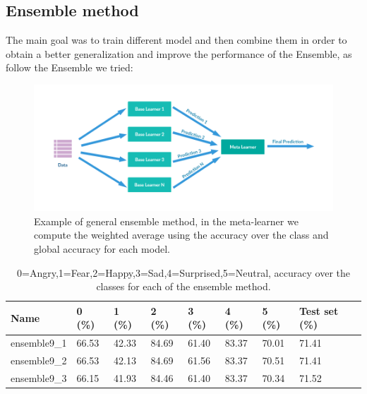 \documentclass[10pt,twocolumn,letterpaper]{article}
\begin{document}
\subsection{Ensemble method}
\label{subsection:ensemble}
The main goal was to train different model and then combine them in order to obtain a better generalization and improve the performance of the Ensemble, as follow the Ensemble we tried:\\
\begin{figure}[H]
   \centering
   \includegraphics[width=1\linewidth]{./immagini/ensemble.png}
   \caption{Example of general ensemble method, in the meta-learner we compute the weighted average using the accuracy over the class and global accuracy for each model.}
\end{figure}
\def\arraystretch{1.2}
\begin{table}[H]
   \scriptsize
   \begin{tabular}{L{1.1cm}C{0.5cm}C{0.5cm}C{0.5cm}C{0.5cm}C{0.5cm}C{0.5cm}C{0.8cm}}
      \hline
      Name         & 0 (\%) & 1 (\%) & 2 (\%) & 3 (\%) & 4 (\%) & 5 (\%) & Test set (\%) \\
      \hline\hline
      ensemble9\_1 & 66.53  & 42.33  & 84.69  & 61.40  & 83.37  & 70.01  & 71.41         \\
      ensemble9\_2 & 66.53  & 42.13  & 84.69  & 61.56  & 83.37  & 70.51  & 71.41         \\
      ensemble9\_3 & 66.15  & 41.93  & 84.46  & 61.40  & 83.37  & 70.34  & 71.52         \\

      \hline
   \end{tabular}
   \caption{ 0=Angry,1=Fear,2=Happy,3=Sad,4=Surprised,5=Neutral, accuracy over the classes for each of the ensemble method.}
   \label{table:accuracyensemble9}
\end{table}
\end{document}
